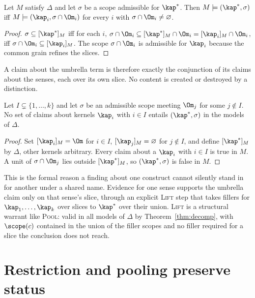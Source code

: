 \begin{theorem}[Decomposition]\label{thm:decomp}
Let $M$ satisfy $\Delta$ and let $\sigma$ be a scope admissible for $\kap^*$. Then $M\models(\kap^*,\sigma)$ iff $M\models(\kap_i,\sigma\cap\Om_i)$ for every $i$ with $\sigma\cap\Om_i\ne\varnothing$.
\end{theorem}

\begin{proof}
$\sigma\subseteq[\kap^*]_M$ iff for each $i$, $\sigma\cap\Om_i\subseteq[\kap^*]_M\cap\Om_i=[\kap_i]_M\cap\Om_i$, iff $\sigma\cap\Om_i\subseteq[\kap_i]_M$. The scope $\sigma\cap\Om_i$ is admissible for $\kap_i$ because the common grain refines the slices.
\end{proof}

A claim about the umbrella term is therefore exactly the conjunction of its claims about the senses, each over its own slice. No content is created or destroyed by a distinction.

\begin{theorem}\label{thm:nosense}
Let $I\subsetneq\{1,\dots,k\}$ and let $\sigma$ be an admissible scope meeting $\Om_j$ for some $j\notin I$. No set of claims about kernels $\kap_i$ with $i\in I$ entails $(\kap^*,\sigma)$ in the models of $\Delta$.
\end{theorem}

\begin{proof}
Set $[\kap_i]_M=\Om$ for $i\in I$, $[\kap_j]_M=\varnothing$ for $j\notin I$, and define $[\kap^*]_M$ by $\Delta$, other kernels arbitrary. Every claim about a $\kap_i$ with $i\in I$ is true in $M$. A unit of $\sigma\cap\Om_j$ lies outside $[\kap^*]_M$, so $(\kap^*,\sigma)$ is false in $M$.
\end{proof}

This is the formal reason a finding about one construct cannot silently stand in for another under a shared name. Evidence for one sense supports the umbrella claim only on that sense's slice, through an explicit \textsc{Lift} step that takes fillers for $\kap_1,\dots,\kap_k$ over slices to $\kap^*$ over their union. \textsc{Lift} is a structural warrant like \textsc{Pool}: valid in all models of $\Delta$ by Theorem~\ref{thm:decomp}, with $\scope(c)$ contained in the union of the filler scopes and no filler required for a slice the conclusion does not reach.

\section{Restriction and pooling preserve status}

